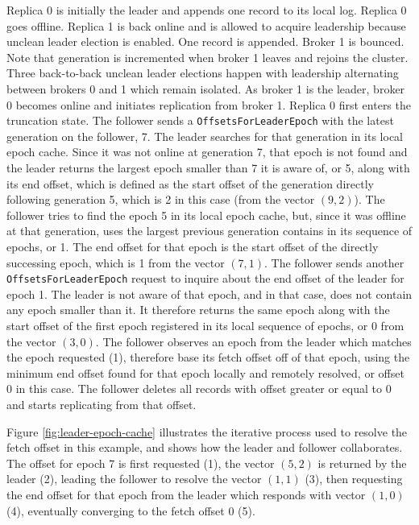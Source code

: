 \documentclass{article}
\begin{document}
\begin{outline}[enumerate]
	\1 Replica 0 is initially the leader and appends one record to its local log.
	\1 Replica 0 goes offline. Replica 1 is back online and is allowed to acquire leadership because unclean leader election is enabled. One record is appended.
	\1 Broker 1 is bounced. Note that generation is incremented when broker 1 leaves and rejoins the cluster.
	\1 Three back-to-back unclean leader elections happen with leadership alternating between brokers 0 and 1 which remain isolated.
	\1 As broker 1 is the leader, broker 0 becomes online and initiates replication from broker 1.
	\1 Replica 0 first enters the truncation state. The follower sends a \texttt{OffsetsForLeaderEpoch} with the latest generation on the follower, 7. The leader searches for that generation in its local epoch cache. Since it was not online at generation 7, that epoch is not found and the leader returns the largest epoch smaller than 7 it is aware of, or 5, along with its end offset, which is defined as the start offset of the generation directly following generation 5, which is 2 in this case (from the vector $(9,2)$).
	\1 The follower tries to find the epoch 5 in its local epoch cache, but, since it was offline at that generation, uses the largest previous generation contains in its sequence of epochs, or 1. The end offset for that epoch is the start offset of the directly successing epoch, which is 1 from the vector $(7,1)$.
	\1 The follower sends another \texttt{OffsetsForLeaderEpoch} request to inquire about the end offset of the leader for epoch 1. The leader is not aware of that epoch, and in that case, does not contain any epoch smaller than it. It therefore returns the same epoch along with the start offset of the first epoch registered in its local sequence of epochs, or 0 from the vector $(3,0)$.
	\1 The follower observes an epoch from the leader which matches the epoch requested (1), therefore base its fetch offset off of that epoch, using the minimum end offset found for that epoch locally and remotely resolved, or offset 0 in this case.
	\1 The follower deletes all records with offset greater or equal to 0 and starts replicating from that offset.
\end{outline}

Figure \ref{fig:leader-epoch-cache} illustrates the iterative process used to resolve the fetch offset in this example, and shows how the leader and follower collaborates. The offset for epoch 7 is first requested (1), the vector $(5,2)$ is returned by the leader (2), leading the follower to resolve the vector $(1,1)$ (3), then requesting the end offset for that epoch from the leader which responds with vector $(1,0)$ (4), eventually converging to the fetch offset 0 (5).
\end{document}
